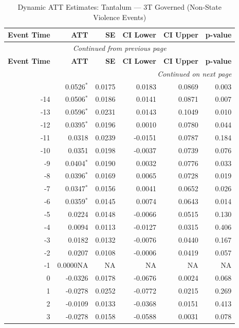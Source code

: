 \begin{longtable}{rrrrrr}
\caption{Dynamic ATT Estimates: Tantalum --- 3T Governed (Non-State Violence Events)} \label{tab:tantalum_non_state_violence_events} \\
\toprule
\textbf{Event Time} & \textbf{ATT} & \textbf{SE} & \textbf{CI Lower} & \textbf{CI Upper} & \textbf{p-value} \\
\midrule
\endfirsthead
\multicolumn{6}{c}{\textit{Continued from previous page}} \\
\toprule
\textbf{Event Time} & \textbf{ATT} & \textbf{SE} & \textbf{CI Lower} & \textbf{CI Upper} & \textbf{p-value} \\
\midrule
\endhead
\midrule \multicolumn{6}{r}{\textit{Continued on next page}} \\
\endfoot
\bottomrule
\endlastfoot
-15 & 0.0526$^{*}$ & 0.0175 & 0.0183 & 0.0869 & 0.003 \\
-14 & 0.0506$^{*}$ & 0.0186 & 0.0141 & 0.0871 & 0.007 \\
-13 & 0.0596$^{*}$ & 0.0231 & 0.0143 & 0.1049 & 0.010 \\
-12 & 0.0395$^{*}$ & 0.0196 & 0.0010 & 0.0780 & 0.044 \\
-11 & 0.0318 & 0.0239 & -0.0151 & 0.0787 & 0.184 \\
-10 & 0.0351 & 0.0198 & -0.0037 & 0.0739 & 0.076 \\
-9 & 0.0404$^{*}$ & 0.0190 & 0.0032 & 0.0776 & 0.033 \\
-8 & 0.0396$^{*}$ & 0.0169 & 0.0065 & 0.0728 & 0.019 \\
-7 & 0.0347$^{*}$ & 0.0156 & 0.0041 & 0.0652 & 0.026 \\
-6 & 0.0359$^{*}$ & 0.0145 & 0.0074 & 0.0643 & 0.014 \\
-5 & 0.0224 & 0.0148 & -0.0066 & 0.0515 & 0.130 \\
-4 & 0.0094 & 0.0113 & -0.0127 & 0.0315 & 0.406 \\
-3 & 0.0182 & 0.0132 & -0.0076 & 0.0440 & 0.167 \\
-2 & 0.0207 & 0.0108 & -0.0006 & 0.0419 & 0.057 \\
-1 & 0.0000NA & NA & NA & NA & NA \\
0 & -0.0326 & 0.0178 & -0.0676 & 0.0024 & 0.068 \\
1 & -0.0278 & 0.0252 & -0.0772 & 0.0215 & 0.269 \\
2 & -0.0109 & 0.0133 & -0.0368 & 0.0151 & 0.413 \\
3 & -0.0278 & 0.0158 & -0.0588 & 0.0031 & 0.078 \\

\end{longtable}
